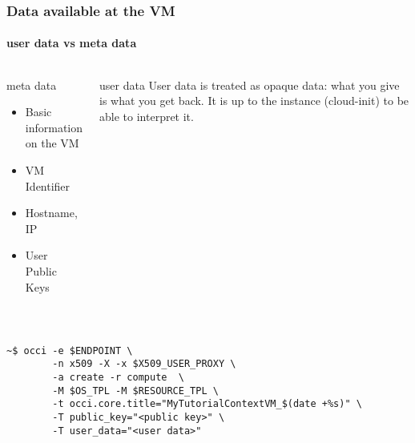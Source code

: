 
\begin{frame}[fragile]
  \frametitle{Data available at the VM}
  \framesubtitle{user data vs meta data}

  \begin{columns}
    \begin{block}{meta data}
    \begin{itemize}
      \item Basic information on the VM 
      \item VM Identifier 
      \item Hostname, IP
      \item User Public Keys
    \end{itemize}
    \end{block}

    \begin{block}{user data}
      User data is treated as opaque data: what you give is what
      you get back. It is up to the instance (cloud-init) to be able to
      interpret it.  
    \end{block}
  \end{columns}

  \hfil\\

  \begin{Sbox}
  \Fontsmaller
  \begin{minipage}{\linewidth-2\fboxsep-2\fboxrule-4pt}
  \color{white}
  \begin{verbatim}
~$ occi -e $ENDPOINT \
        -n x509 -X -x $X509_USER_PROXY \
        -a create -r compute  \
        -M $OS_TPL -M $RESOURCE_TPL \
        -t occi.core.title="MyTutorialContextVM_$(date +%s)" \
        -T public_key="<public key>" \
        -T user_data="<user data>"
  \end{verbatim}
  \end{minipage}
  \end{Sbox}
  \fcolorbox{black}{black}{\TheSbox}
\end{frame}


